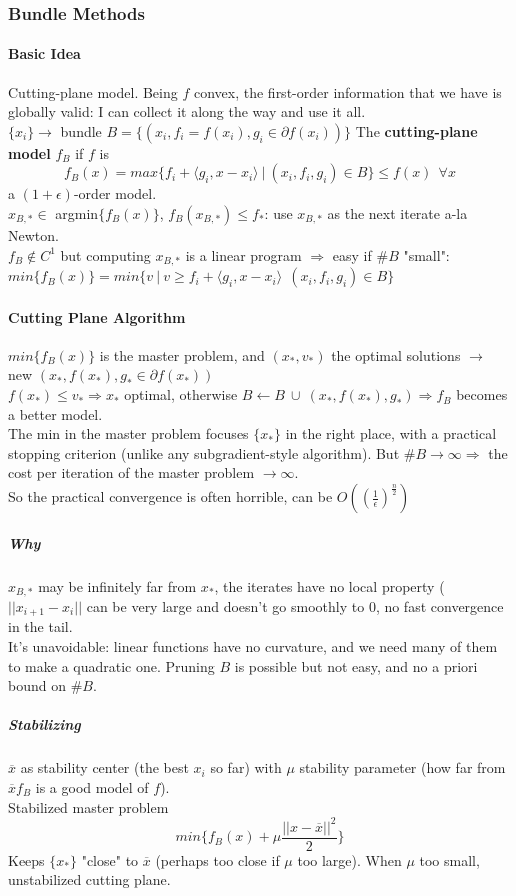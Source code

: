 \documentclass[10pt]{report}
\begin{document}
\subsubsection{Bundle Methods}
\paragraph{Basic Idea} Cutting-plane model. Being $f$ convex, the first-order information that we have is globally valid: I can collect it along the way and use it all.\\
$\{x_i\}\rightarrow$ bundle $B=\{(x_i, f_i = f(x_i), g_i\in\partial f(x_i))\}$
The \textbf{cutting-plane model} $f_B$ if $f$ is $$f_B(x) = max\{f_i+\langle g_i, x-x_i\rangle\:|\:(x_i, f_i, g_i)\in B\}\leq f(x)\:\:\forall x$$ a $(1+\epsilon)$-order model.\\
$x_{B,*}\in$ argmin$\{f_B(x)\}$, $f_B(x_{B,*})\leq f_*$: use $x_{B,*}$ as the next iterate a-la Newton.\\
$f_B\not\in C^1$ but computing $x_{B,*}$ is a linear program $\Rightarrow$ easy if $\# B$ "small": $min\{f_B(x)\}=min\{v\:|\:v\geq f_i+\langle g_i, x-x_i\rangle\:\:(x_i, f_i, g_i)\in B\}$
\paragraph{Cutting Plane Algorithm} $min\{f_B(x)\}$ is the master problem, and $(x_*, v_*)$ the optimal solutions $\rightarrow$ new $(x_*, f(x_*), g_*\in\partial f(x_*))$\\
$f(x_*)\leq v_*\Rightarrow x_*$ optimal, otherwise $B\leftarrow B\:\cup\:(x_*, f(x_*), g_*)\Rightarrow f_B$ becomes a better model.\\
The min in the master problem focuses $\{x_*\}$ in the right place, with a practical stopping criterion (unlike any subgradient-style algorithm). But $\#B\rightarrow\infty\Rightarrow$ the cost per iteration of the master problem $\rightarrow\infty$.\\
So the practical convergence is often horrible, can be $O\left( \left(\frac{1}{\epsilon}\right)^{\frac{n}{2}}\right)$
\subparagraph{Why} $x_{B,*}$ may be infinitely far from $x_*$, the iterates have no local property ($||x_{i+1}-x_i||$ can be very large and doesn't go smoothly to $0$, no fast convergence in the tail.\\
It's unavoidable: linear functions have no curvature, and we need many of them to make a quadratic one. Pruning $B$ is possible but not easy, and no a priori bound on $\# B$.
\subparagraph{Stabilizing} $\overline{x}$ as stability center (the best $x_i$ so far) with $\mu$ stability parameter (how far from $\overline{x} f_B$ is a good model of $f$).\\
Stabilized master problem $$min\{f_B(x)+\mu\frac{||x-\overline{x}||^2}{2}\}$$ Keeps $\{x_*\}$ "close" to $\overline{x}$ (perhaps too close if $\mu$ too large). When $\mu$ too small, unstabilized cutting plane.
\end{document}
